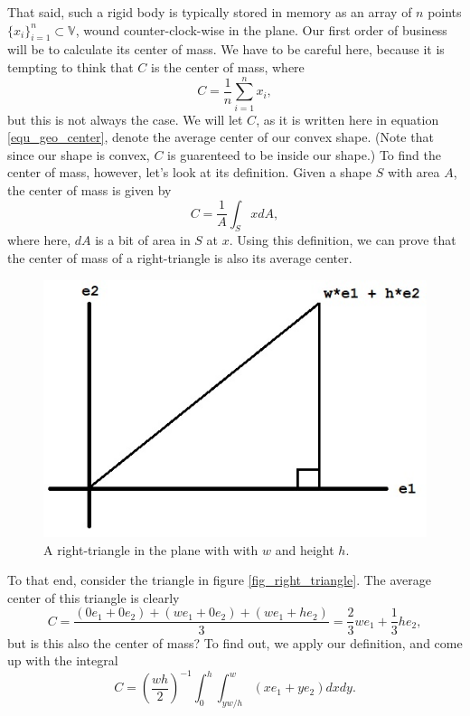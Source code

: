 \documentclass[12pt]{article}
\newcommand{\V}{\mathbb{V}}
\begin{document}
That said, such a rigid body is typically stored in memory as an array of $n$ points $\{x_i\}_{i=1}^n\subset\V$, wound counter-clock-wise in the plane.
Our first order of business will be to calculate its center of mass.  We have to be careful here, because it is tempting to think that $C$ is the center
of mass, where
\begin{equation}\label{equ_geo_center}
C = \frac{1}{n}\sum_{i=1}^n x_i,
\end{equation}
but this is not always the case.  We will let $C$, as it is written here in equation \eqref{equ_geo_center},
denote the average center of our convex shape.  (Note that since
our shape is convex, $C$ is guarenteed to be inside our shape.)
To find the center of mass, however, let's look at its definition.  Given a shape $S$ with area $A$, the center of
mass is given by
\begin{equation}
C = \frac{1}{A}\int_S x dA,
\end{equation}
where here, $dA$ is a bit of area in $S$ at $x$.  Using this definition, we can prove that the center of mass of a right-triangle
is also its average center.
\begin{figure}\label{fig_right_triangle}
\centering
\includegraphics[scale=0.5]{right_triangle}
\caption{A right-triangle in the plane with with $w$ and height $h$.}
\end{figure}
To that end, consider the triangle in figure \eqref{fig_right_triangle}.  The average center of this triangle is clearly
\begin{equation}\label{right_triangle_geo_center}
C = \frac{(0e_1 + 0e_2) + (we_1 + 0e_2) + (we_1 + he_2)}{3} = \frac{2}{3}we_1 + \frac{1}{3}he_2,
\end{equation}
but is this also the center of mass?  To find out, we apply our definition, and come up with the integral
\begin{equation}\label{right_triangle_integral}
C = \left(\frac{wh}{2}\right)^{-1}\int_0^h\int_{yw/h}^w(xe_1 + ye_2)dxdy.
\end{equation}
\end{document}
